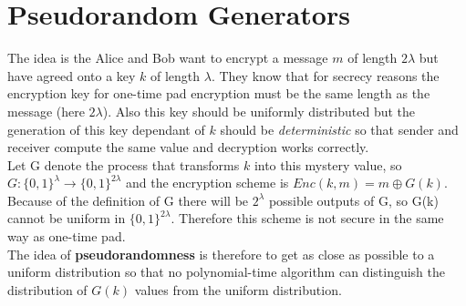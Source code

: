 \documentclass{article}
\begin{document}
		\section{Pseudorandom Generators}
		\begin{adjustwidth}{2em}{2em}
			The idea is the Alice and Bob want to encrypt a message $m$ of length $2\lambda$ but have agreed onto a key $k$ of length $\lambda$. They know that for secrecy reasons the encryption key for one-time pad encryption must be the same length as the message (here $2 \lambda$). Also this key should be uniformly distributed but the generation of this key dependant of $k$ should be \textit{deterministic} so that sender and receiver compute the same value and decryption works correctly. \\
			Let G denote the process that transforms $k$ into this mystery value, so $G : \{ 0,1 \} ^{\lambda} \rightarrow \{ 0,1 \} ^{2\lambda}$ and the encryption scheme is $Enc(k,m) = m \oplus G(k)$. \\
			Because of the definition of G there will be $2^{\lambda}$ possible outputs of G, so G(k) cannot be uniform in $\{ 0,1 \} ^{2\lambda}$. Therefore this scheme is not secure in the same way as one-time pad. \\
			The idea of \textbf{pseudorandomness} is therefore to get as close as possible to a uniform distribution so that no polynomial-time algorithm can distinguish the distribution of $G(k)$ values from the uniform distribution.

\end{adjustwidth}
\end{document}
